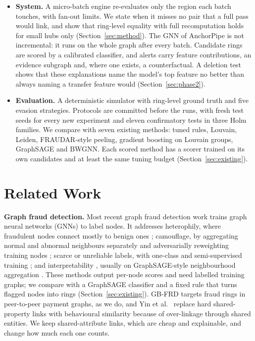 \begin{itemize}
and we report them as rejected: gating the GNN's message passing around busy
attributes, and anchoring GNN probabilities to evidence edges.
\item \textbf{System.} A micro-batch engine re-evaluates only the region each
batch touches, with fan-out limits. We state when it misses no pair that a full
pass would link, and show that ring-level equality with full recomputation
holds for small hubs only (Section~\ref{sec:method}). The GNN of AnchorPipe is
not incremental: it runs on the whole graph after every batch. Candidate rings
are scored by a calibrated classifier, and alerts carry feature contributions,
an evidence subgraph and, where one exists, a counterfactual. A deletion test
shows that these explanations name the model's top feature no better than
always naming a transfer feature would (Section~\ref{sec:phase2}).
\item \textbf{Evaluation.} A deterministic simulator with ring-level ground
truth and five evasion strategies. Protocols are committed before the runs,
with fresh test seeds for every new experiment and eleven confirmatory tests in
three Holm families. We compare with seven existing methods: tuned rules,
Louvain, Leiden, FRAUDAR-style peeling, gradient boosting on Louvain groups,
GraphSAGE and BWGNN. Each scored method has a scorer trained on its own
candidates and at least the same tuning budget (Section~\ref{sec:existing}).
\end{itemize}

\section{Related Work}
\label{sec:related}
\textbf{Graph fraud detection.} Most recent graph fraud detection work trains
graph neural networks (GNNs) to label nodes. It addresses heterophily, where
fraudulent nodes connect mostly to benign ones \cite{hu2025hhgfd,lv2026mandate};
camouflage, by aggregating normal and abnormal neighbours separately and
adversarially reweighting training nodes \cite{liu2025robust}; scarce
or unreliable labels, with one-class and semi-supervised training
\cite{li2025ocgfd,giles2023suspicious,peng2023csocan}; and interpretability
\cite{yu2024ingfd}, usually on GraphSAGE-style neighbourhood aggregation
\cite{hamilton2017graphsage}. These methods output per-node scores and need
labelled training graphs; we compare with a GraphSAGE classifier and a fixed
rule that turns flagged nodes into rings (Section~\ref{sec:existing}). GB-FRD \cite{pan2025gbfrd} targets fraud rings in peer-to-peer
payment graphs, as we do, and Yin et al.\ \cite{yin2022behavioral} replace hard
shared-property links with behavioural similarity because of over-linkage
through shared entities. We keep shared-attribute links, which are cheap and
explainable, and change how much each one counts.

